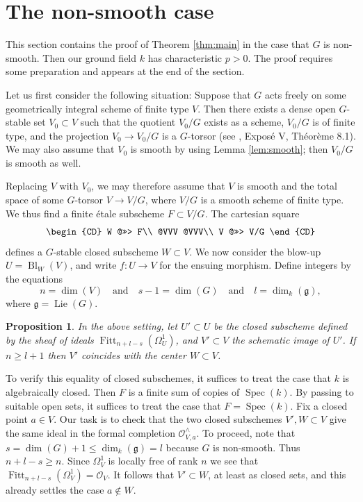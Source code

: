 \documentclass[oneside, 12pt]{amsart}
\newtheorem{proposition}[theorem]{Proposition}
\theoremstyle{definition}
\theoremstyle{remark}
\newcommand{\catO}{\mathcal{O}}
\newcommand{\Bl}{\operatorname{Bl}}
\newcommand{\Fitt}{\operatorname{Fitt}}
\newcommand{\Lie}{\operatorname{Lie}}
\renewcommand{\O}{\mathscr{O}}
\newcommand{\quadand}{\quad\text{and}\quad}
\newcommand{\ra}{\rightarrow}
\newcommand{\Spec}{\operatorname{Spec}}
\newcommand{\lieg}{\mathfrak{g}}
\begin{document}
\section{The non-smooth case}
\label{sec:ns}

This section contains the proof of Theorem \ref{thm:main} 
in the case that $G$ is non-smooth. 
Then our ground field $k$ has characteristic $p>0$.  
The proof requires some preparation and appears at the end of the section.

Let us first consider the following situation: Suppose that $G$ acts freely 
on some geometrically integral scheme of finite type $V$.  
Then there exists a dense open $G$-stable set $V_0 \subset V$ such that 
the quotient $V_0/G$ exists as a scheme,  $V_0/G$ is of finite type,  
and the projection $V_0 \to V_0/G$ is a $G$-torsor (see 
\cite{SGA 3a}, Expos\'e V,  Th\'eor\`eme 8.1).  
We may also assume that $V_0$ is smooth by using Lemma \ref{lem:smooth}; 
then $V_0/G$ is smooth as well.  

Replacing $V$ with $V_0$,  we may therefore assume that 
$V$ is smooth and the total space of some  $G$-torsor $V \to V/G$, 
where $V/G$ is a smooth scheme of finite type.
We thus find a finite \'etale subscheme $F \subset V/G$.  
The cartesian square 
$$
\begin{CD}
W	@>>> 	F\\
@VVV		@VVV\\
V	@>>>	V/G
\end{CD}
$$
defines a $G$-stable closed subscheme $W \subset V$. 
We now consider the blow-up $U = \Bl_W(V)$, 
and write $f:U\ra V$ for the ensuing morphism.
Define integers by the equations
\begin{equation}
\label{some integers}
n=\dim(V)\quadand s-1=\dim(G)\quadand  l  =\dim_k(\lieg),
\end{equation}
where $\lieg=\Lie(G)$.   


\begin{proposition}
\label{image equals center}
In the above setting, let $U'\subset U$ be the closed subscheme defined
by the sheaf of ideals $\Fitt_{n+ l-s}(\Omega^1_U)$, and $V' \subset V$
the schematic image of $U'$. If $n\geq l+1$ then $V'$ coincides with 
the center $W \subset V$.
\end{proposition}

\proof
To verify this equality of closed subschemes, 
it suffices to treat the case that $k$ is algebraically closed.
Then $F$ is a finite sum of copies of $\Spec(k)$.
By passing to suitable open sets, it suffices to treat the case that $F = \Spec(k)$.
Fix a closed point $a\in V$. Our task is to check that  
the two closed subschemes $V',W\subset V$ give the same ideal 
in the formal completion $\O_{V,a}^\wedge$.
To proceed, note that    $s=\dim(G)+1\leq \dim_k(\lieg) =l$ because $G$ is non-smooth. Thus $n +l-s\geq n$.
Since  $\Omega^1_V$ is locally free of rank $n$ we see that 
$\Fitt_{n +l-s}(\Omega^1_V) = \catO_V$.
It follows that $V' \subset W$, at least as closed sets, 
and this already settles the case $a\notin W$.
\end{document}
